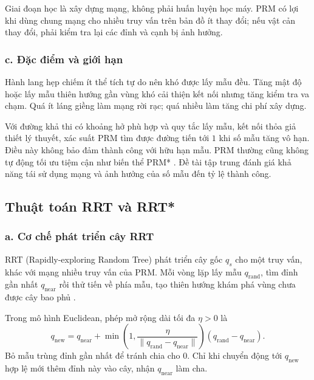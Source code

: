\documentclass[12pt,a4paper,oneside]{report}
\begin{document}
Giai đoạn học là xây dựng mạng, không phải huấn luyện học máy. PRM có lợi khi dùng chung mạng cho nhiều truy vấn trên bản đồ ít thay đổi; nếu vật cản thay đổi, phải kiểm tra lại các đỉnh và cạnh bị ảnh hưởng.

\subsubsection*{c. Đặc điểm và giới hạn}

Hành lang hẹp chiếm ít thể tích tự do nên khó được lấy mẫu đều. Tăng mật độ hoặc lấy mẫu thiên hướng gần vùng khó cải thiện kết nối nhưng tăng kiểm tra va chạm. Quá ít láng giềng làm mạng rời rạc; quá nhiều làm tăng chi phí xây dựng.

Với đường khả thi có khoảng hở phù hợp và quy tắc lấy mẫu, kết nối thỏa giả thiết lý thuyết, xác suất PRM tìm được đường tiến tới \(1\) khi số mẫu tăng vô hạn. Điều này không bảo đảm thành công với hữu hạn mẫu. PRM thường cũng không tự động tối ưu tiệm cận như biến thể PRM* \cite{karaman-frazzoli-2011}. Đề tài tập trung đánh giá khả năng tái sử dụng mạng và ảnh hưởng của số mẫu đến tỷ lệ thành công.

\subsection{\texorpdfstring{Thuật toán RRT và RRT*}{Thuật toán RRT và RRT*}}

\subsubsection*{a. Cơ chế phát triển cây RRT}

RRT (Rapidly-exploring Random Tree) phát triển cây gốc \(q_s\) cho một truy vấn, khác với mạng nhiều truy vấn của PRM. Mỗi vòng lặp lấy mẫu \(q_{\mathrm{rand}}\), tìm đỉnh gần nhất \(q_{\mathrm{near}}\) rồi thử tiến về phía mẫu, tạo thiên hướng khám phá vùng chưa được cây bao phủ \cite{lavalle-rrt-1998}.

Trong mô hình Euclidean, phép mở rộng dài tối đa \(\eta>0\) là
\begin{equation}
  q_{\mathrm{new}}=q_{\mathrm{near}}
    +\min\!\left(1,\frac{\eta}{\|q_{\mathrm{rand}}-q_{\mathrm{near}}\|}\right)
      (q_{\mathrm{rand}}-q_{\mathrm{near}}).
  \label{eq:rrt-steer}
\end{equation}
Bỏ mẫu trùng đỉnh gần nhất để tránh chia cho \(0\). Chỉ khi chuyển động tới \(q_{\mathrm{new}}\) hợp lệ mới thêm đỉnh này vào cây, nhận \(q_{\mathrm{near}}\) làm cha.
\end{document}
